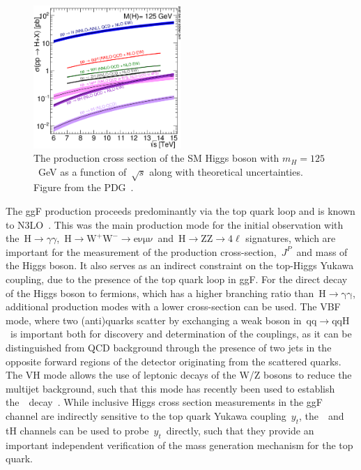 \begin{figure}
\begin{centering}
\includegraphics[width=0.5\textwidth]{figures/theory/Higgs_XS_7-14TeV-2016.eps}
\caption[The production cross-section of the Higgs boson]{The production cross section of the SM Higgs boson with $m_H = 125$~GeV as a function of~$\sqrt{s}$ along with theoretical uncertainties. Figure from the PDG~\cite{Patrignani:2016xqp}.}
\label{fig:higgs_xs}
\end{centering}
\end{figure}

The ggF production proceeds predominantly via the top quark loop and is known to N3LO~\cite{Anastasiou:2016cez}. This was the main production mode for the initial observation with the~$\mathrm{H} \rightarrow \gamma \gamma$,~$\mathrm{H} \rightarrow \mathrm{W}^+\mathrm{W}^- \rightarrow \mathrm{e} \mathrm{\nu} \mathrm{\mu} \mathrm{\nu}$~and~$\mathrm{H} \rightarrow \mathrm{Z}\mathrm{Z} \rightarrow 4\ell$ signatures, which are important for the measurement of the production cross-section,~$J^P$~and mass of the Higgs boson. It also serves as an indirect constraint on the top-Higgs Yukawa coupling, due to the presence of the top quark loop in ggF. For the direct decay of the Higgs boson to fermions, which has a higher branching ratio than~$\mathrm{H} \rightarrow \mathrm{\gamma \gamma}$, additional production modes with a lower cross-section can be used. The VBF mode, where two (anti)quarks scatter by exchanging a weak boson in~$\mathrm{qq} \rightarrow \mathrm{qqH}$~is important both for discovery and determination of the couplings, as it can be distinguished from QCD background through the presence of two jets in the opposite forward regions of the detector originating from the scattered quarks. The VH mode allows the use of leptonic decays of the W/Z bosons to reduce the multijet background, such that this mode has recently been used to establish the~\Hbb~decay~\cite{Aaboud:2017xsd}. While inclusive Higgs cross section measurements in the ggF channel are indirectly sensitive to the top quark Yukawa coupling~$y_t$, the~\ttH~and tH channels can be used to probe~$y_t$~directly, such that they provide an important independent verification of the mass generation mechanism for the top quark.

